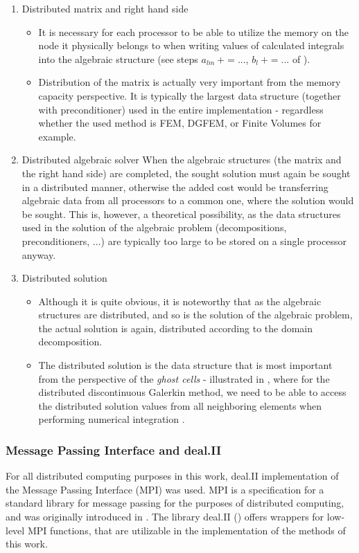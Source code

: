 \begin{enumerate}
	\item
		Distributed matrix and right hand side
		\begin{itemize}
			\item It is necessary for each processor to be able to utilize the memory on the node it physically belongs to when writing values of calculated integrals into the algebraic structure (see steps $a_{lm}\ +=...$, $b_{l}\ +=...$ of ).
			\item Distribution of the matrix is actually very important from the memory capacity perspective. It is typically the largest data structure (together with preconditioner) used in the entire implementation - regardless whether the used method is FEM, DGFEM, or Finite Volumes for example.
		\end{itemize}
	\item
		Distributed algebraic solver
	When the algebraic structures (the matrix and the right hand side) are completed, the sought solution must again be sought in a distributed manner, otherwise the added cost would be transferring algebraic data from all processors to a common one, where the solution would be sought. This is, however, a theoretical possibility, as the data structures used in the solution of the algebraic problem (decompositions, preconditioners, ...) are typically too large to be stored on a single processor anyway.
	\item
		Distributed solution
		\begin{itemize}
			\item Although it is quite obvious, it is noteworthy that as the algebraic structures are distributed, and so is the solution of the algebraic problem, the actual solution is again, distributed according to the domain decomposition.
			\item The distributed solution is the data structure that is most important from the perspective of the \textit{ghost cells} - illustrated in , where for the distributed discontinuous Galerkin method, we need to be able to access the distributed solution values from all neighboring elements when performing numerical integration .
		\end{itemize}
\end{enumerate}
\subsubsection{Message Passing Interface and deal.II}
For all distributed computing purposes in this work, deal.II implementation of the Message Passing Interface (MPI) was used. MPI is a specification for a standard library for message passing for the purposes of distributed computing, and was originally introduced in \cite{mpi}. The library deal.II (\cite{deal}) offers wrappers for low-level MPI functions, that are utilizable in the implementation of the methods of this work.
